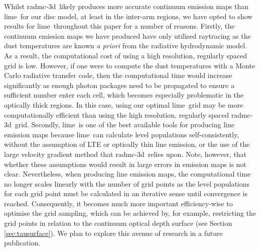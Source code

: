 \documentclass[fleqn,usenatbib]{mnras}
\newcommand{\lime}{{\sc lime}}
\newcommand{\radmc}{{\sc radmc-3d}}
\begin{document}
Whilst \radmc\ likely produces more accurate continuum emission maps than \lime\ for our disc model, at least in the inter-arm regions, we have opted to show results for \lime\ throughout this paper for a number of reasons. Firstly, the continuum emission maps we have produced have only utilised raytracing as the dust temperatures are known \textit{a priori} from the radiative hydrodynamic model. As a result, the computational cost of using a high resolution, regularly spaced grid is low. However, if one were to compute the dust temperatures with a Monte Carlo radiative transfer code, then the computational time would increase significantly as enough photon packages need to be propagated to ensure a sufficient number enter each cell, which becomes especially problematic in the optically thick regions. In this case, using our optimal \lime\ grid may be more computationally efficient than using the high resolution, regularly spaced \radmc\ grid. Secondly, \lime\ is one of the best available tools for producing line emission maps because \lime\ can calculate level populations self-consistently, without the assumption of LTE or optically thin line emission, or the use of the large velocity gradient method that \radmc\ relies upon. Note, however, that whether these assumptions would result in large errors in emission maps is not clear. Nevertheless, when producing line emission maps, the computational time no longer scales linearly with the number of grid points as the level populations for each grid point must be calculated in an iterative sense until convergence is reached. Consequently, it becomes much more important efficiency-wise to optimise the grid sampling, which can be achieved by, for example, restricting the grid points in relation to the continuum optical depth surface (see Section \ref{sec:tausurface}). We plan to explore this avenue of research in a future publication.



\bsp	%
\label{lastpage}
\end{document}
